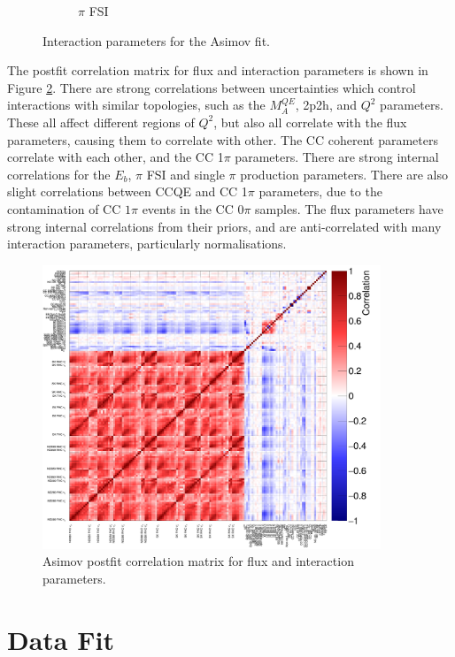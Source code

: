 \begin{figure}
\begin{subfigure}{0.49\textwidth}
  \caption{$\pi$ FSI}
\end{subfigure}
\caption{Interaction parameters for the Asimov fit.}
\label{fig:asmvxsec}
\end{figure}

The postfit correlation matrix for flux and interaction parameters is shown in Figure \ref{fig:asmvpostfitcov}. There are strong correlations between uncertainties which control interactions with similar topologies, such as the $M^{QE}_A$, 2p2h, and $Q^2$ parameters. These all affect different regions of $Q^2$, but also all correlate with the flux parameters, causing them to correlate with other. The CC coherent parameters correlate with each other, and the CC 1$\pi$ parameters. There are strong internal correlations for the $E_b$, $\pi$ FSI and single $\pi$ production parameters. There are also slight correlations between CCQE and CC 1$\pi$ parameters, due to the contamination of CC $1\pi$ events in the CC 0$\pi$ samples. The flux parameters have strong internal correlations from their priors, and are anti-correlated with many interaction parameters, particularly normalisations.

\begin{figure}
\centering
\includegraphics*[width=0.9\textwidth,clip]{figs/Mach3AsmvCorr}
\caption{Asimov postfit correlation matrix for flux and interaction parameters.}\label{fig:asmvpostfitcov}
\end{figure}

\section{Data Fit}\label{sec:datafit}

